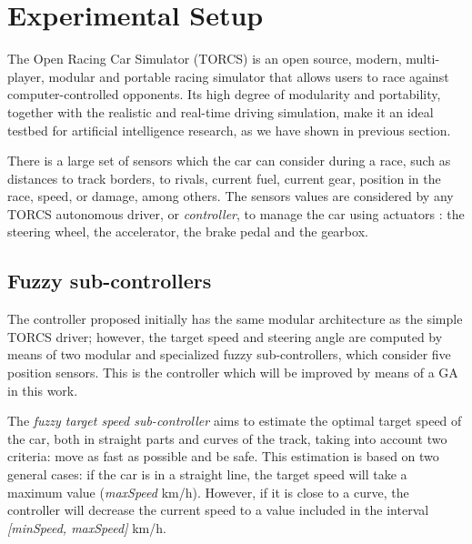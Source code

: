 \documentclass[conference]{IEEEtran}
\begin{document}

\section{Experimental Setup}
\label{sec:experimental_setup}

The Open Racing Car Simulator (TORCS) \cite{WebTORCS} is an open source, modern, multi-player, modular and portable racing simulator that allows users to race against computer-controlled opponents.
Its high degree of modularity and portability, together with the realistic and real-time driving simulation, make it an ideal testbed for artificial intelligence research, as we have shown in previous section.

There is a large set of sensors \cite{Torcs3} which the car can consider during a race, such as distances to track borders, to rivals, current fuel, current gear, position in the race, speed, or damage, among others.
The sensors values are considered by any TORCS autonomous driver, or {\em controller}, to manage the car using actuators \cite{Torcs3}: the steering wheel, the accelerator, the brake pedal and the gearbox.  



\subsection{Fuzzy sub-controllers}
\label{subsec:subcontrollers}

The controller proposed initially \cite{evo17} has the same modular
architecture as the simple TORCS driver; however, the target speed and
steering angle are computed by means of two modular and specialized
fuzzy sub-controllers, which consider five position sensors. This is
the controller which will be improved by means of a GA in this
work.

The {\em fuzzy target speed sub-controller} aims to estimate the
optimal target speed of the car, both in straight parts and curves of
the track, taking into account two criteria: move as fast as possible
and be safe. This estimation is based on two general cases: if the car
is in a straight line, the target speed will take a maximum value
(\textit{maxSpeed} km/h). However, if it is close to a curve, the
controller will decrease the current speed to a value included in the
interval \textit{[minSpeed, maxSpeed]} km/h. 
\end{document}
